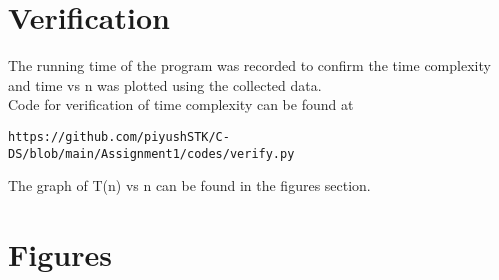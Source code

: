 \documentclass[journal,12pt,twocolumn]{IEEEtran}
\begin{document}
\section{Verification}
The running time of the program was recorded to confirm the time complexity and time vs n was plotted using the collected data.\\
Code for verification of time complexity can be found at 
\begin{lstlisting}
https://github.com/piyushSTK/C-DS/blob/main/Assignment1/codes/verify.py
\end{lstlisting}
The graph of T(n) vs n can be found in the figures section.\\







\newpage






\setcounter{figure}{0}





\section{Figures}
\label{Figures}
\end{document}
